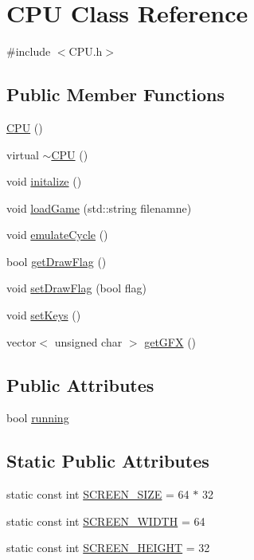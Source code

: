 \hypertarget{classCPU}{\section{C\-P\-U Class Reference}
\label{classCPU}
}


{\ttfamily \#include $<$C\-P\-U.\-h$>$}

\subsection*{Public Member Functions}
\begin{DoxyCompactItemize}
\item 
\hyperlink{classCPU_a2fdd8153d0979ccad9ed8452897267f4}{C\-P\-U} ()
\item 
virtual \hyperlink{classCPU_aa32e0ed85bebabb167ace09050d20707}{$\sim$\-C\-P\-U} ()
\item 
void \hyperlink{classCPU_ad78f88b03032587507f0e48a58866560}{initalize} ()
\item 
void \hyperlink{classCPU_ad40d5c22c7df265ed603a33843fa3ee4}{load\-Game} (std\-::string filenamne)
\item 
void \hyperlink{classCPU_a039ffcdbd6bd2c41bd8362b6e546b0d8}{emulate\-Cycle} ()
\item 
bool \hyperlink{classCPU_a68658621a98bf997bfd736c9c64f3fac}{get\-Draw\-Flag} ()
\item 
void \hyperlink{classCPU_a9356ef4051a2badfa3ff8a8baa8f3dc4}{set\-Draw\-Flag} (bool flag)
\item 
void \hyperlink{classCPU_a9bbdc09cee677e45c26214fb731e0620}{set\-Keys} ()
\item 
vector$<$ unsigned char $>$ \hyperlink{classCPU_af69c6616761fe8c264b048c96663fab2}{get\-G\-F\-X} ()
\end{DoxyCompactItemize}
\subsection*{Public Attributes}
\begin{DoxyCompactItemize}
\item 
bool \hyperlink{classCPU_ac13fd4e7e628ad487d6b7c9573c51a09}{running}
\end{DoxyCompactItemize}
\subsection*{Static Public Attributes}
\begin{DoxyCompactItemize}
\item 
static const int \hyperlink{classCPU_a06c3d3ec8c47f48c437256e8910840a1}{S\-C\-R\-E\-E\-N\-\_\-\-S\-I\-Z\-E} = 64 $\ast$ 32
\item 
static const int \hyperlink{classCPU_a8feada83f7887e1a418c4dd308fbd4a9}{S\-C\-R\-E\-E\-N\-\_\-\-W\-I\-D\-T\-H} = 64
\item 
static const int \hyperlink{classCPU_a0c73376f8f7ed2cdcdc97967433e23b7}{S\-C\-R\-E\-E\-N\-\_\-\-H\-E\-I\-G\-H\-T} = 32
\end{DoxyCompactItemize}
